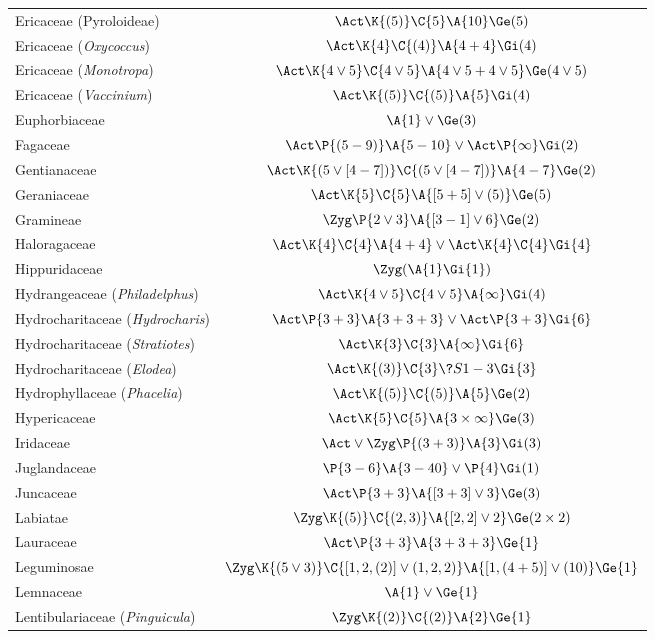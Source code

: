 ﻿\documentclass[12pt]{article}
\begin{document}
\begin{longtable}{lc}
Ericaceae (Pyroloideae) & $\Act\K{(5)}\C{5}\A{10}\Ge(5)$\\[2pt]
Ericaceae (\textit{Oxycoccus}) & $\Act\K{4}\C{(4)}\A{4+4}\Gi(4)$\\[2pt]
Ericaceae (\textit{Monotropa}) & $\Act\K{4\vee5}\C{4\vee5}\A{4\vee5+4\vee5}\Ge(4\vee5)$\\[2pt]
Ericaceae (\textit{Vaccinium}) & $\Act\K{(5)}\C{(5)}\A{5}\Gi(4)$\\[2pt]
Euphorbiaceae & $\A{1}\vee\Ge(3)$\\[2pt]
Fagaceae & $\Act\P{(5-9)}\A{5-10}\vee\Act\P{\infty}\Gi(2)$\\[2pt]
Gentianaceae & $\Act\K{(5\vee[4-7])}\C{(5\vee[4-7])}\A{4-7}\Ge(2)$\\[2pt]
Geraniaceae & $\Act\K{5}\C{5}\A{[5+5]\vee(5)}\Ge(5)$\\[2pt]
Gramineae & $\Zyg\P{2\vee3}\A{[3-1]\vee6}\Ge(2)$\\[2pt]
Haloragaceae & $\Act\K{4}\C{4}\A{4+4}\vee\Act\K{4}\C{4}\Gi{4}$\\[2pt]
Hippuridaceae & $\Zyg(\A{1}\Gi{1})$\\[2pt]
Hydrangeaceae (\textit{Philadelphus}) & $\Act\K{4\vee5}\C{4\vee5}\A{\infty}\Gi(4)$\\[2pt]
Hydrocharitaceae (\textit{Hydrocharis}) & $\Act\P{3+3}\A{3+3+3}\vee\Act\P{3+3}\Gi{6}$\\[2pt]
Hydrocharitaceae (\textit{Stratiotes}) & $\Act\K{3}\C{3}\A{\infty}\Gi{6}$\\[2pt]
Hydrocharitaceae (\textit{Elodea}) & $\Act\K{(3)}\C{3}\?{S}{1-3}\Gi{3}$\\[2pt]
Hydrophyllaceae (\textit{Phacelia}) & $\Act\K{(5)}\C{(5)}\A{5}\Ge(2)$\\[2pt]
Hypericaceae & $\Act\K{5}\C{5}\A{3\times\infty}\Ge(3)$\\[2pt]
Iridaceae & $\Act\vee\Zyg\P{(3+3)}\A{3}\Gi(3)$\\[2pt]
Juglandaceae & $\P{3-6}\A{3-40}\vee\P{4}\Gi(1)$\\[2pt]
Juncaceae & $\Act\P{3+3}\A{[3+3]\vee3}\Ge(3)$\\[2pt]
Labiatae & $\Zyg\K{(5)}\C{(2,3)}\A{[2,2]\vee2}\Ge(2\times2)$\\[2pt]
Lauraceae & $\Act\P{3+3}\A{3+3+3}\Ge{1}$\\[2pt]
Leguminosae & $\Zyg\K{(5\vee3)}\C{[1,2,(2)]\vee(1,2,2)}\A{[1,(4+5)]\vee(10)}\Ge{1}$\\[2pt]
Lemnaceae & $\A{1}\vee\Ge{1}$\\[2pt]
Lentibulariaceae (\textit{Pinguicula}) & $\Zyg\K{(2)}\C{(2)}\A{2}\Ge{1}$\\[2pt]

\end{longtable}
\end{document}
